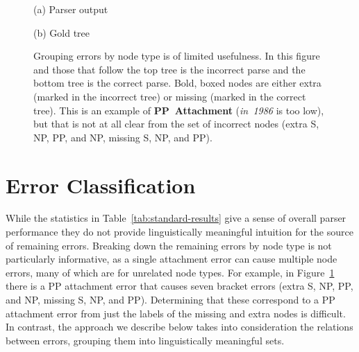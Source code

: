 \begin{figure}
\begin{center}

(a) Parser output
\vspace{3mm}


(b) Gold tree
\end{center}
\derivspace
\caption[Error analysis example: PP Attachment.]{ \label{fig:PP-attachment}
	Grouping errors by node type is of limited usefulness.  In this figure and
	those that follow the top tree is the incorrect parse and the bottom tree is
	the correct parse.  Bold, boxed nodes are either extra (marked in the
	incorrect tree) or missing (marked in the correct tree).  This is an example
	of \textbf{PP~Attachment} (\emph{in~1986} is too low), but that is not at all
	clear from the set of incorrect nodes (extra S, NP, PP, and NP, missing S,
	NP, and PP).
}
\derivaftercompress
\end{figure}

\section{Error Classification}

While the statistics in Table~\ref{tab:standard-results} give a sense of
overall parser performance they do not provide linguistically meaningful
intuition for the source of remaining errors.  Breaking down the remaining
errors by node type is not particularly informative, as a single attachment
error can cause multiple node errors, many of which are for unrelated node
types.  For example, in Figure~\ref{fig:PP-attachment} there is a PP attachment
error that causes seven bracket errors (extra S, NP, PP, and NP, missing S,
NP, and PP).  Determining that these correspond to a PP attachment error from
just the labels of the missing and extra nodes is difficult.  In contrast, the
approach we describe below takes into consideration the relations between
errors, grouping them into linguistically meaningful sets.

